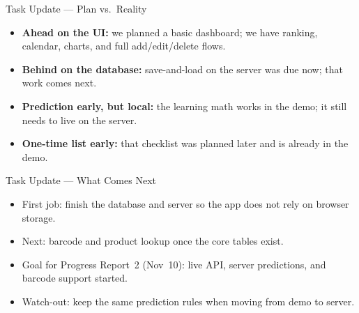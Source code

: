 \documentclass[aspectratio=169]{beamer}
\begin{document}
\begin{frame}{Task Update --- Plan vs.\ Reality}
  \begin{itemize}
    \item \textbf{Ahead on the UI:} we planned a basic dashboard; we have ranking, calendar, charts, and full add/edit/delete flows.
    \item \textbf{Behind on the database:} save-and-load on the server was due now; that work comes next.
    \item \textbf{Prediction early, but local:} the learning math works in the demo; it still needs to live on the server.
    \item \textbf{One-time list early:} that checklist was planned later and is already in the demo.
  \end{itemize}
\end{frame}

\begin{frame}{Task Update --- What Comes Next}
  \begin{itemize}
    \item First job: finish the database and server so the app does not rely on browser storage.
    \item Next: barcode and product lookup once the core tables exist.
    \item Goal for Progress Report~2 (Nov~10): live API, server predictions, and barcode support started.
    \item Watch-out: keep the same prediction rules when moving from demo to server.
  \end{itemize}
\end{frame}
\end{document}
